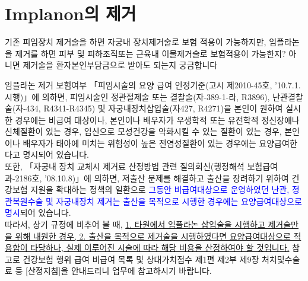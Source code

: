 \section{Implanon의 제거}

기존 피임장치 제거술을 하면 자궁내 장치제거술로 보험 적용이 가능하지만, 임플라논을 제거를 하면 피부 및 피하조직또는 근육내 이물제거술로 보험적용이 가능한지? 아니면 제거술을 환자본인부담금으로 받아도 되는지 궁금합니다

\begin{commentbox}{임플라논 제거 보험여부} 
「피임시술의 요양 급여 인정기준(고시 제2010-45호, ’10.7.1.시행)」에 의하면, 피임시술인 정관절제술 또는 결찰술(자-389-1-라, R3896), 난관결찰술(자-434, R4341-R4345) 및 자궁내장치삽입술(자427, R4271)을 본인이 원하여 실시한 경우에는 비급여 대상이나, 본인이나 배우자가 우생학적 또는 유전학적 정신장애나 신체질환이 있는 경우, 임신으로 모성건강을 악화시킬 수 있는 질환이 있는 경우, 본인이나 배우자가 태아에 미치는 위험성이 높은 전염성질환이 있는 경우에는 요양급여한다고 명시되어 있습니다.\\
또한, 「자궁내 장치 교체시 제거료 산정방법 관련 질의회신(행정해석 보험급여과-2186호, ’08.10.8)」에 의하면, 저출산 문제를 해결하고 출산을 장려하기 위하여 건강보험 지원을 확대하는 정책의 일환으로 \textcolor{blue}{그동안 비급여대상으로 운영하였던 난관, 정관복원수술 및 자궁내장치 제거는 출산을 목적으로 시행한 경우에는 요양급여대상으로 명시}되어 있습니다.\\
따라서, 상기 규정에 비추어 볼 때, \uline{1. 타원에서 임플라논 삽입술을 시행하고 제거술만을 위해 내원한 경우, 2. 출산을 목적으로 제거술을 시행하였다면 요양급여대상으로 적용함이 타당하나, 실제 이루어진 시술에 따라 해당 비용을 산정하여야 할 것입니다.} 참고로 건강보험 행위 급여 비급여 목록 및 상대가치점수 제1편 제2부 제9장 처치및수술료 등 [산정지침]을 안내드리니 업무에 참고하시기 바랍니다.
\end{commentbox}

